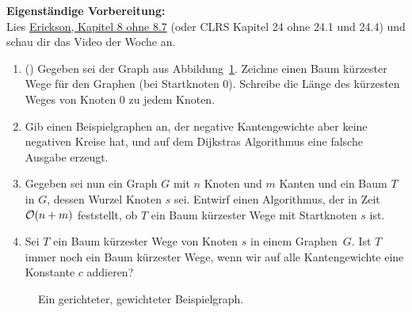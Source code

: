 \documentclass{uebung_cs}
\begin{document}
\textbf{Eigenständige Vorbereitung:}\\
Lies  \href{https://jeffe.cs.illinois.edu/teaching/algorithms/book/Algorithms-JeffE.pdf}{Erickson, Kapitel 8 ohne 8.7} (oder CLRS Kapitel 24 ohne 24.1 und 24.4) und schau dir das  Video der Woche an.

\begin{aufgabe}\label{tue-first}\mbox{}
	\begin{enumerate}
		\item (\warmup) Gegeben sei der Graph aus Abbildung~\ref{example_graph}.
		Zeichne einen Baum kürzester Wege für den Graphen (bei Startknoten 0).
		Schreibe die Länge des kürzesten Weges von Knoten 0 zu jedem Knoten.
		\item Gib einen Beispielgraphen an, der negative Kantengewichte aber keine negativen Kreise hat, und auf dem Dijkstras Algorithmus eine falsche Ausgabe erzeugt.
		\item Gegeben sei nun ein Graph $G$ mit $n$ Knoten und $m$ Kanten und ein Baum $T$ in $G$, dessen Wurzel Knoten $s$ sei.
		Entwirf einen Algorithmus, der in Zeit $\mathcal{O}(n+m)$ feststellt, ob $T$ ein Baum kürzester Wege mit Startknoten $s$ ist.
		\item Sei $T$ ein Baum kürzester Wege von Knoten $s$ in einem Graphen~$G$.
		Ist $T$ immer noch ein Baum kürzester Wege, wenn wir auf alle Kantengewichte eine Konstante $c$ addieren?
	\end{enumerate}
\end{aufgabe}
\begin{figure}[h]
	\begin{center}
		\caption{\label{example_graph}Ein gerichteter, gewichteter Beispielgraph.}
	\end{center}
\end{figure}
\end{document}
